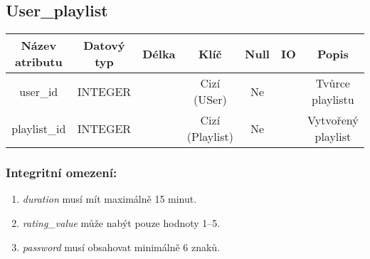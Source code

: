 \subsection*{User\_playlist}
\begin{tabular}{ |c|c c c c c|c| }
    \hline
    \textbf{Název atributu} & \textbf{Datový typ} & \textbf{Délka} & \textbf{Klíč}   & \textbf{Null} & \textbf{IO} & \textbf{Popis}                         \\
    \hline
    user\_id                & INTEGER             &                & Cizí (USer)     & Ne            &             & Tvůrce playlistu   \\
    playlist\_id            & INTEGER             &                & Cizí (Playlist) & Ne            &             & Vytvořený playlist \\
    \hline
\end{tabular}
\bigskip

\subsubsection*{Integritní omezení:}
\begin{enumerate}
    \item \textit{duration} musí mít maximálně 15 minut.
    \item \textit{rating\_value} může nabýt pouze hodnoty 1--5.
    \item \textit{password} musí obsahovat minimálně 6 znaků.
\end{enumerate}
